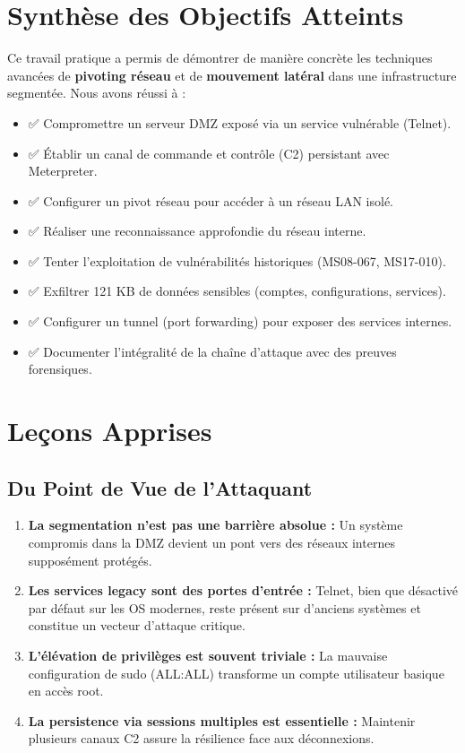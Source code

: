 \documentclass[12pt,a4paper,openany]{report}
\begin{document}
	\section{Synthèse des Objectifs Atteints}
	
	Ce travail pratique a permis de démontrer de manière concrète les techniques avancées de \textbf{pivoting réseau} et de \textbf{mouvement latéral} dans une infrastructure segmentée. Nous avons réussi à :
	
	\begin{itemize}
		\item ✅ Compromettre un serveur DMZ exposé via un service vulnérable (Telnet).
		\item ✅ Établir un canal de commande et contrôle (C2) persistant avec Meterpreter.
		\item ✅ Configurer un pivot réseau pour accéder à un réseau LAN isolé.
		\item ✅ Réaliser une reconnaissance approfondie du réseau interne.
		\item ✅ Tenter l'exploitation de vulnérabilités historiques (MS08-067, MS17-010).
		\item ✅ Exfiltrer 121 KB de données sensibles (comptes, configurations, services).
		\item ✅ Configurer un tunnel (port forwarding) pour exposer des services internes.
		\item ✅ Documenter l'intégralité de la chaîne d'attaque avec des preuves forensiques.
	\end{itemize}
	
	\section{Leçons Apprises}
	
	\subsection{Du Point de Vue de l'Attaquant}
	
	\begin{enumerate}
		\item \textbf{La segmentation n'est pas une barrière absolue :} Un système compromis dans la DMZ devient un pont vers des réseaux internes supposément protégés.
		
		\item \textbf{Les services legacy sont des portes d'entrée :} Telnet, bien que désactivé par défaut sur les OS modernes, reste présent sur d'anciens systèmes et constitue un vecteur d'attaque critique.
		
		\item \textbf{L'élévation de privilèges est souvent triviale :} La mauvaise configuration de sudo (ALL:ALL) transforme un compte utilisateur basique en accès root.
		
		\item \textbf{La persistence via sessions multiples est essentielle :} Maintenir plusieurs canaux C2 assure la résilience face aux déconnexions.
	\end{enumerate}
	
\end{document}
